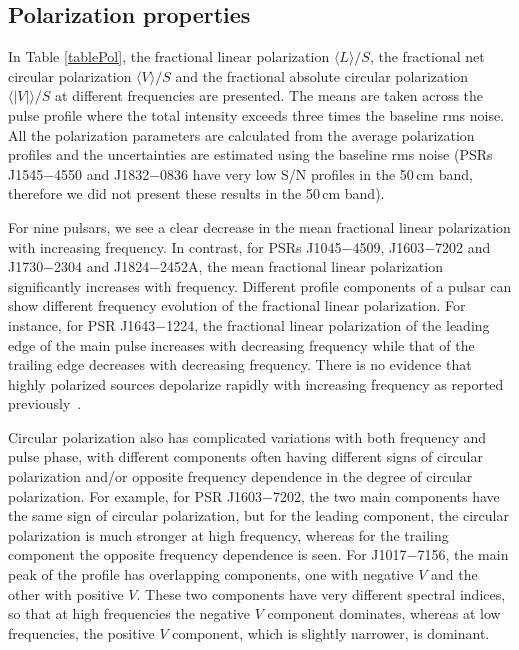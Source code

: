 \documentclass[useAMS,usenatbib]{mn2e}
\begin{document}
\subsection{Polarization properties}

In Table \ref{tablePol}, the fractional linear polarization $\langle L \rangle/S$, 
the fractional net circular polarization $\langle V \rangle/S$ and the fractional absolute 
circular polarization $\langle|V|\rangle/S$ at different frequencies are presented. 
%
The means are taken across the pulse profile where the total intensity exceeds 
three times the baseline rms noise.
%
All the polarization parameters are calculated from the average polarization 
profiles and the uncertainties are estimated using the baseline rms noise 
(PSRs J1545$-$4550 and J1832$-$0836 have very low S/N profiles in the 50\,cm band, 
therefore we did not present these results in the 50\,cm band). 
%

For nine pulsars, we see a clear decrease in the mean fractional linear polarization 
with increasing frequency. In contrast, for PSRs J1045$-$4509, J1603$-$7202 and 
J1730$-$2304 and J1824$-$2452A, the mean fractional linear polarization significantly 
increases with frequency. 
%
Different profile components of a pulsar can show different frequency evolution 
of the fractional linear polarization. For instance, for PSR J1643$-$1224, the fractional 
linear polarization of the leading edge of the main pulse increases with decreasing 
frequency while that of the trailing edge decreases with decreasing frequency.
%
There is no evidence that highly polarized sources depolarize rapidly 
with increasing frequency as reported previously~\citep{Kramer99}.
%

Circular polarization also has complicated variations with both frequency and pulse 
phase, with different components often having different signs of circular polarization 
and/or opposite frequency dependence in the degree of circular polarization. For example, 
for PSR J1603$-$7202, the two main components have the same sign of circular polarization, 
but for the leading component, the circular polarization is much stronger at high frequency, 
whereas for the trailing component the opposite frequency dependence is seen. For J1017$-$7156, 
the main peak of the profile has overlapping components, one with negative $V$ and the 
other with positive $V$. These two components have very different spectral indices, so 
that at high frequencies the negative $V$ component dominates, whereas at low frequencies, 
the positive $V$ component, which is slightly narrower, is dominant.
%
\end{document}
